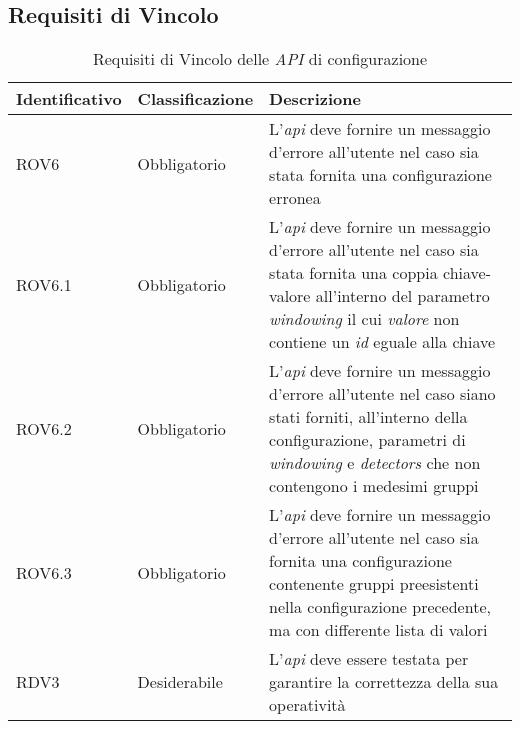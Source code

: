 \subsection{Requisiti di Vincolo}
{
\centering
\begin{longtable}{L{3cm} L{3cm} L{7.5cm}}
\caption{Requisiti di Vincolo delle \textit{API} di configurazione}\\
\textbf{Identificativo} &
\textbf{Classificazione}&
\textbf{Descrizione}\\
\endhead
\hline
ROV6 & Obbligatorio & L'\textit{\gls{api}} deve fornire un messaggio d'errore all'utente nel caso sia stata fornita una configurazione erronea\\
\hline
ROV6.1 & Obbligatorio & L'\textit{\gls{api}} deve fornire un messaggio d'errore all'utente nel caso sia stata fornita una coppia chiave-valore all'interno del parametro \textit{windowing} il cui \textit{valore} non contiene un \textit{id} eguale alla chiave\\
\hline
ROV6.2 & Obbligatorio & L'\textit{\gls{api}} deve fornire un messaggio d'errore all'utente nel caso siano stati forniti, all'interno della configurazione, parametri di \textit{windowing} e \textit{detectors} che non contengono i medesimi gruppi\\
\hline
ROV6.3 & Obbligatorio & L'\textit{\gls{api}} deve fornire un messaggio d'errore all'utente nel caso sia fornita una configurazione contenente gruppi preesistenti nella configurazione precedente, ma con differente lista di valori\\
\hline
RDV3 & Desiderabile & L'\textit{\gls{api}} deve essere testata per garantire la correttezza della sua operatività\\
\hline
\end{longtable}
}


